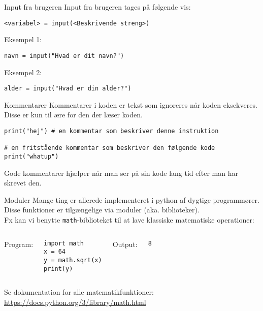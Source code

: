 \begin{frame}[fragile]{Input fra brugeren}
	Input fra brugeren tages på følgende vis:
	\begin{lstlisting}[style=python]
<variabel> = input(<Beskrivende streng>)
	\end{lstlisting}
	Eksempel 1:
	\begin{lstlisting}[style=python]
navn = input("Hvad er dit navn?")
	\end{lstlisting}
	Eksempel 2:
	\begin{lstlisting}[style=python]
alder = input("Hvad er din alder?")
	\end{lstlisting}
\end{frame}

\begin{frame}[fragile]{Kommentarer}
	Kommentarer i koden er tekst som ignoreres når koden eksekveres. Disse er kun til ære for den der læser koden.
	\begin{lstlisting}[style=python]
print("hej") # en kommentar som beskriver denne instruktion

# en fritstående kommentar som beskriver den følgende kode
print("whatup")
	\end{lstlisting}
	Gode kommentarer hjælper når man ser på sin kode lang tid efter man har skrevet den.
\end{frame}

\begin{frame}[fragile]{Moduler}
	Mange ting er allerede implementeret i python af dygtige programmører.
	Disse funktioner er tilgængelige via moduler (aka. biblioteker). \\
	Fx kan vi benytte \texttt{math}-biblioteket til at lave klassiske matematiske operationer:

	\bigskip
	\begin{columns}
		Program:
		\begin{lstlisting}[style=python]
import math
x = 64
y = math.sqrt(x)
print(y)
		\end{lstlisting}
		Output:
		\begin{lstlisting}[style=python]
8
		\end{lstlisting}
	\end{columns}


	Se dokumentation for alle matematikfunktioner:
	\url{https://docs.python.org/3/library/math.html}
\end{frame}




